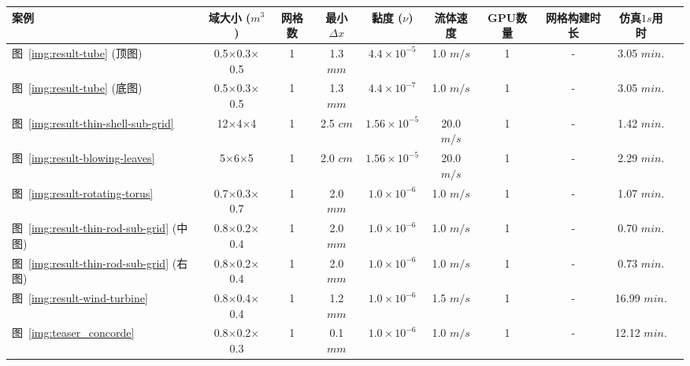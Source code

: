 \begin{table}
	\vspace*{-4mm}
	\begin{center}
		\renewcommand{\arraystretch}{0.8}
		\scalebox{0.87}
		{
			\begin{tabular}{lccccccccc}
        \toprule
				{案例} & {域大小} ($m^3$) & {网格数} & {最小$\Delta x$} & {黏度} ($\nu$) & {流体速度} & {GPU数量} & {网格构建时长} & {仿真$1s$用时} \\
				\midrule
				图~\ref{img:result-tube} (顶图)					& 0.5$\times$0.3$\times$0.5		& 1 				& 1.3 $mm$					& $4.4\!\times\!10^{-5}$	& 1.0 $m/s$			& 1					& - 					& 3.05 $min.$			\\
				图~\ref{img:result-tube} (底图)					& 0.5$\times$0.3$\times$0.5		& 1 				& 1.3 $mm$					& $4.4\!\times\!10^{-7}$	& 1.0 $m/s$			& 1					& - 					& 3.05 $min.$			\\
				图~\ref{img:result-thin-shell-sub-grid}			& 12$\times$4$\times$4			& 1 				& 2.5 $cm$					& $1.56\!\times\!10^{-5}$	& 20.0 $m/s$		& 1					& - 					& 1.42 $min.$			\\
				图~\ref{img:result-blowing-leaves}				& 5$\times$6$\times$5			& 1 				& 2.0 $cm$					& $1.56\!\times\!10^{-5}$	& 20.0 $m/s$		& 1					& - 					& 2.29 $min.$			\\
				图~\ref{img:result-rotating-torus}				& 0.7$\times$0.3$\times$0.7 	& 1 				& 2.0 $mm$					& $1.0\!\times\!10^{-6}$	& 1.0 $m/s$			& 1					& - 					& 1.07 $min.$			\\
				图~\ref{img:result-thin-rod-sub-grid} (中图)	& 0.8$\times$0.2$\times$0.4		& 1 				& 2.0 $mm$					& $1.0\!\times\!10^{-6}$	& 1.0 $m/s$			& 1					& - 					& 0.70 $min.$			\\
			 	图~\ref{img:result-thin-rod-sub-grid} (右图)	& 0.8$\times$0.2$\times$0.4		& 1 				& 2.0 $mm$					& $1.0\!\times\!10^{-6}$	& 1.0 $m/s$			& 1					& - 					& 0.73 $min.$			\\
				图~\ref{img:result-wind-turbine}				& 0.8$\times$0.4$\times$0.4		& 1 				& 1.2 $mm$					& $1.0\!\times\!10^{-6}$	& 1.5 $m/s$			& 1					& - 					& 16.99 $min.$			\\
				图~\ref{img:teaser_concorde}					& 0.8$\times$0.2$\times$0.3		& 1 				& 0.1 $mm$					& $1.0\!\times\!10^{-6}$	& 1.0 $m/s$			& 1					& - 					& 12.12 $min.$			\\

\end{tabular}}
\end{center}
\end{table}
